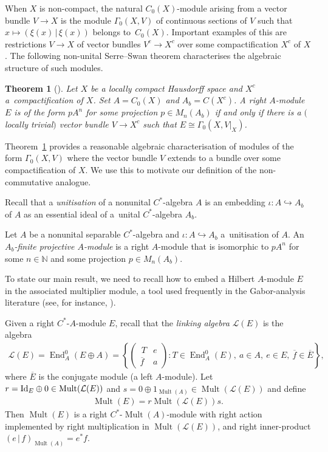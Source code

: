 \documentclass[10pt,a4paper]{amsart}
\numberwithin{equation}{section}
\newtheorem{thm}{Theorem}[section]
\DeclareMathOperator{\End}{End} %
\DeclareMathOperator{\Mult}{Mult} %
\renewcommand{\L}{\mathcal{L}}
\newcommand{\N}{\mathbb{N}} %
\newcommand{\ol}[1]{\overline{#1}} %
\begin{document}
When $X$ is non-compact, the natural $C_0(X)$-module arising from a vector bundle $V \to X$ is the module $\Gamma_0(X,V)$ of continuous sections of $V$ such that $x \mapsto (\xi(x) \,|\, \xi(x))$ belongs to~$C_0(X)$. Important examples of this are restrictions $V \to X$ of vector bundles $V^c\to X^c$ over some compactif\/ication $X^c$ of $X$. The following non-unital Serre--Swan theorem characterises the algebraic structure of such modules.

\begin{thm}[{\cite[Theorem~8]{RennieSmooth}}]
\label{thm:nonunital-SS} Let $X$ be a locally compact Hausdorff space and $X^c$ a~compacti\-fication of $X$. Set $A=C_0(X)$ and $A_b=C(X^c)$. A right $A$-module $E$ is of the form $pA^n$ for some projection $p\in M_n(A_b)$ if and only if there is a $($locally trivial$)$ vector bundle $V \to X^c$ such that $E \cong \Gamma_0(X,V|_X)$.
\end{thm}

Theorem~\ref{thm:nonunital-SS} provides a reasonable algebraic characterisation of modules of the form $\Gamma_0(X, V)$ where the vector bundle $V$ extends to a bundle over some compactif\/ication of $X$. We use this to motivate our def\/inition of the non-commutative analogue.

Recall that a \emph{unitisation} of a nonunital $C^*$-algebra $A$ is an embedding $\iota\colon A \hookrightarrow A_b$ of $A$ as an essential ideal of a~unital $C^*$-algebra $A_b$.

\begin{defn} \label{def:a-b-fgp} Let $A$ be a nonunital separable $C^*$-algebra and $\iota\colon A\hookrightarrow A_b$ a~unitisation of $A$. An \emph{$A_b$-finite projective $A$-module} is a right $A$-module that is isomorphic to $pA^n$ for some $n \in \N$ and some projection $p\in M_n(A_b)$.
\end{defn}

To state our main result, we need to recall how to embed a Hilbert $A$-module $E$ in the associated multiplier module, a tool used frequently in the Gabor-analysis literature (see, for instance, \cite{AB,RT}).

\begin{defn} \label{defn:mult-link} Given a right $C^*$-$A$-module $E$, recall that the \emph{linking algebra} $\L(E)$ is the algebra
\begin{gather*}
\L(E)=\End^0_A(E\oplus A)
=\left\{\begin{pmatrix} \,T & e\\ \ol{f} & a\end{pmatrix}\colon T\in \End_A^0(E),\ a\in A,\ e\in E,\ \ol{f}\in \ol{E}\right\},
\end{gather*}
where $\ol{E}$ is the conjugate module (a left $A$-module). Let $r={\rm Id}_E\oplus 0\in\Mult(\L(E))$ and $s=0\oplus 1_{\Mult(A)}\in \Mult(\L(E))$ and def\/ine
\begin{gather*}
\Mult(E)=r\Mult(\L(E))s.
\end{gather*}
Then $\Mult(E)$ is a right $C^*$-$\Mult(A)$-module with right action implemented by right multiplication in $\Mult(\L(E))$, and right inner-product $(e \,|\, f)_{\Mult(A)} = e^* f$.
\end{defn}
\end{document}
